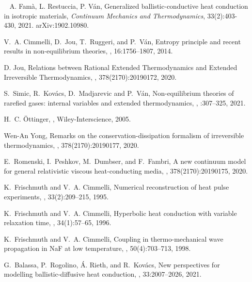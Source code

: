 \documentclass[sn-mathphys]{sn-jnl}%
\theoremstyle{thmstyleone}%
\theoremstyle{thmstyletwo}%
\theoremstyle{thmstylethree}%
\begin{document}
\begin{thebibliography}{9}
	A. Fam\`a, L. Restuccia, P. V\'an,
	Generalized ballistic-conductive heat conduction in isotropic materials,
	{\em Continuum Mechanics and Thermodynamics}, 33(2):403-430, 2021.
	arXiv:1902.10980.
	
	V.~A. Cimmelli, D.~Jou, T.~Ruggeri, and P.~V\'an,
	\newblock Entropy principle and recent results in non-equilibrium theories,
	, 16:1756--1807, 2014.
	
	D. Jou,
	\newblock Relations between {R}ational {E}xtended {T}hermodynamics and
	{E}xtended {I}rreversible {T}hermodynamics,
	,
	378(2170):20190172, 2020.
	
	S.~Simic, R.~Kov\'acs, D.~Madjarevic and P.~V\'an,
	\newblock Non-equilibrium theories of rarefied gases: internal variables and extended thermodynamics,
	,
	:307--325, 2021.
	
	H.~C. \"Ottinger,
	,
	\newblock Wiley-Interscience, 2005.
	
	Wen-An Yong,
	\newblock Remarks on the conservation-dissipation formalism of irreversible
	thermodynamics,
	,
	378(2170):20190177, 2020.
	
	E.~Romenski, I.~Peshkov, M.~Dumbser, and F.~Fambri,
	\newblock A new continuum model for general relativistic viscous
	heat-conducting media,
	,
	378(2170):20190175, 2020.
	
	
	K.~Frischmuth and V.~A. Cimmelli,
	\newblock Numerical reconstruction of heat pulse experiments,
	, 33(2):209--215,
	1995.
	
	K.~Frischmuth and V.~A. Cimmelli,
	\newblock Hyperbolic heat conduction with variable relaxation time,
	, 34(1):57--65,
	1996.
	
	K.~Frischmuth and V.~A. Cimmelli,
	\newblock Coupling in thermo-mechanical wave propagation in {N}a{F} at low temperature,
	, 50(4):703--713, 1998.
	
	G.~Balassa, P.~Rogolino, \'A. Rieth, and R.~Kov\'acs,
	\newblock New perspectives for modelling ballistic-diffusive heat conduction,
	, 33:2007--2026, 2021.
	

\end{thebibliography}
\end{document}
